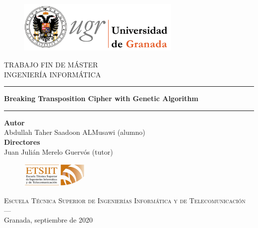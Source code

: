 ﻿	\begin{figure}[h]
		\centering
		\includegraphics[width=0.7\textwidth]{images/logoUGR.jpg}
		\label{imagen2}
	\end{figure}

	\begin{center}
		\Large{TRABAJO FIN DE MÁSTER} \\
		\large{INGENIERÍA INFORMÁTICA}
	\end{center}
	
	\vspace{0.5cm}
	
	\hrule
	
	\begin{center}
		\huge{\textbf{Breaking Transposition Cipher with Genetic Algorithm}} \\
			\end{center}
	
	\hrule
	
	\vspace{0.5cm}
	
	\begin{center}
		\textbf{Autor} \\
		Abdullah Taher Saadoon ALMusawi  (alumno)\\
		\textbf{Directores}\\
		Juan Julián Merelo Guervós (tutor)
	\end{center}
	
	\vspace{0.6cm}
	
	\begin{figure}[h]
		\centering
		\includegraphics[width=0.3\textwidth]{images/etsiit_logo.png}\\[0.1cm]
	\end{figure}
	
	\begin{center}
	\textsc{Escuela Técnica Superior de Ingenierías Informática y de Telecomunicación}\\
	\textsc{---}\\
	Granada, septiembre de 2020
	\end{center}
	
	\newpage